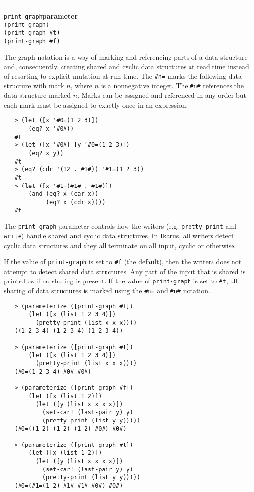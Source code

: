 \documentclass[onecolumn, 12pt, twoside, openright, dvipdfm]{book}
\makeatletter
\newcommand{\idxlabeldefun}[5]{
\vspace{1ex}
\rule{\textwidth}{2pt}
{\phantomsection\index{#1@\texttt{#2}}\label{#3}{\Large\texttt{#4}}\hfill\textbf{#5}}\\}
\newcommand{\idxdefun}[3]{\idxlabeldefun{#1}{#2}{#1}{#2}{#3}}
\newcommand{\defun}[2]{\idxdefun{#1}{#1}{#2}}
\makeatother
\begin{document}
\defun{print-graph}{parameter}
\texttt{(print-graph)} \\
\texttt{(print-graph \#t)}\\
\texttt{(print-graph \#f)}

\label{graph-syntax}
The graph notation is a way of marking and referencing parts of a
data structure and, consequently, creating shared and cyclic data
structures at read time instead of resorting to explicit mutation at
run time.  The \verb|#n=| marks the following data structure with
mark $n$, where $n$ is a nonnegative integer.  The \verb|#n#|
references the data structure marked $n$.  Marks can be assigned and
referenced in any order but each mark must be assigned to exactly
once in an expression.

\begin{verbatim}
   > (let ([x '#0=(1 2 3)])
       (eq? x '#0#))
   #t
   > (let ([x '#0#] [y '#0=(1 2 3)])
       (eq? x y))
   #t
   > (eq? (cdr '(12 . #1#)) '#1=(1 2 3))
   #t
   > (let ([x '#1=(#1# . #1#)])
       (and (eq? x (car x)) 
            (eq? x (cdr x))))
   #t
\end{verbatim}

The \texttt{print-graph} parameter controls how the writers (e.g.
\texttt{pretty-print} and \texttt{write}) handle shared and cyclic
data structures.  In Ikarus, all writers detect cyclic data
structures and they all terminate on all input, cyclic or otherwise.

If the value of \texttt{print-graph} is set to \texttt{\#f} (the
default), then the writers does not attempt to detect shared data
structures.  Any part of the input that is shared is printed as if
no sharing is present.
If the value of \texttt{print-graph} is set to \texttt{\#t}, all
sharing of data structures is marked using the \texttt{\#n=} and
\texttt{\#n\#} notation. 


\begin{verbatim}
   > (parameterize ([print-graph #f])
       (let ([x (list 1 2 3 4)])
         (pretty-print (list x x x))))
   ((1 2 3 4) (1 2 3 4) (1 2 3 4))

   > (parameterize ([print-graph #t])
       (let ([x (list 1 2 3 4)])
         (pretty-print (list x x x))))
   (#0=(1 2 3 4) #0# #0#)

   > (parameterize ([print-graph #f])
       (let ([x (list 1 2)])
         (let ([y (list x x x x)])
           (set-car! (last-pair y) y)
           (pretty-print (list y y)))))
   (#0=((1 2) (1 2) (1 2) #0#) #0#)

   > (parameterize ([print-graph #t])
       (let ([x (list 1 2)])
         (let ([y (list x x x x)])
           (set-car! (last-pair y) y)
           (pretty-print (list y y)))))
   (#0=(#1=(1 2) #1# #1# #0#) #0#)
\end{verbatim}
\end{document}
